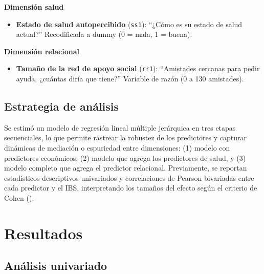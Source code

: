 \documentclass[
  spanish,
  a4paper,
  oneside]{scrbook}
\providecommand{\tightlist}{%
  \setlength{\itemsep}{0pt}\setlength{\parskip}{0pt}}
\begin{document}
\textbf{Dimensión salud}

\begin{itemize}
\tightlist
\item
  \textbf{Estado de salud autopercibido} (\texttt{ss1}): ``¿Cómo es su
  estado de salud actual?'' Recodificada a dummy (0 = mala, 1 = buena).
\end{itemize}

\textbf{Dimensión relacional}

\begin{itemize}
\tightlist
\item
  \textbf{Tamaño de la red de apoyo social} (\texttt{rr1}): ``Amistades
  cercanas para pedir ayuda, ¿cuántas diría que tiene?'' Variable de
  razón (0 a 130 amistades).
\end{itemize}

\section{Estrategia de análisis}\label{estrategia-de-anuxe1lisis}

Se estimó un modelo de regresión lineal múltiple jerárquica en tres
etapas secuenciales, lo que permite rastrear la robustez de los
predictores y capturar dinámicas de mediación o espuriedad entre
dimensiones: (1) modelo con predictores económicos, (2) modelo que
agrega los predictores de salud, y (3) modelo completo que agrega el
predictor relacional. Previamente, se reportan estadísticos descriptivos
univariados y correlaciones de Pearson bivariadas entre cada predictor y
el IBS, interpretando los tamaños del efecto según el criterio de Cohen
().


\chapter{Resultados}\label{resultados}

\section{Análisis univariado}\label{anuxe1lisis-univariado}
\end{document}
